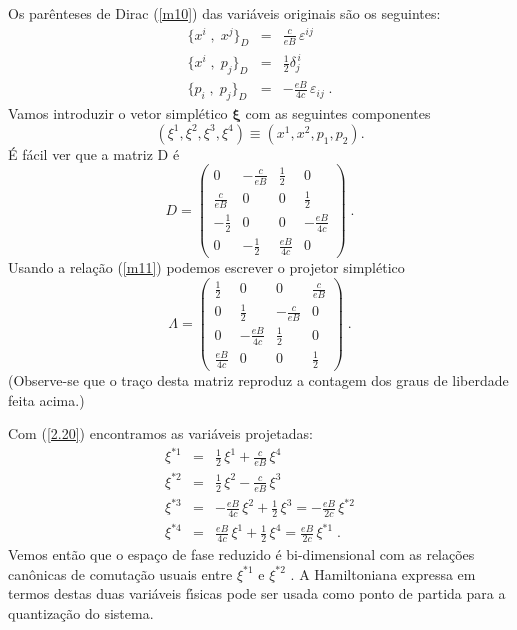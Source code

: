 \documentclass[a4paper,thmsa,12pt]{report}
\begin{document}
Os par\^{e}nteses de Dirac (\ref{m10}) das vari\'{a}veis originais s\~{a}o
os seguintes: 
\begin{eqnarray}
\{x^{i}\;,\;x^{j}\}_{D}&=&\frac{c}{eB}\,\varepsilon ^{ij}  \label{2.15} \\
\{x^{i}\;,\;p_{j}\}_{D}&=&\frac{1}{2}\delta _{j}^{\,i}  \label{2.16} \\
\{p_{i}\;,\;p_{j}\}_{D}&=&-\frac{eB}{4c}\,\varepsilon _{ij}\;.  \label{2.17}
\end{eqnarray}
Vamos introduzir o vetor simpl\'{e}tico $\mathbf{\xi }$ com as seguintes
componentes 
\begin{equation}
\left( \xi ^{1},\xi ^{2},\xi ^{3},\xi ^{4}\right) \equiv \left(
x^{1},x^{2},p_{1},p_{2}\right) .  \label{2.18}
\end{equation}
\'{E} f\'{a}cil ver que a matriz D \'{e} 
\begin{equation}
D={\left( 
\begin{array}{cccc}
0 & -\frac{c}{eB} & \frac{1}{2} & 0 \\ 
\frac{c}{eB} & 0 & 0 & \frac{1}{2} \\ 
-\frac{1}{2} & 0 & 0 & -\frac{eB}{4c} \\ 
0 & -\frac{1}{2} & \frac{eB}{4c} & 0
\end{array}
\right)} \;.  \label{2.19}
\end{equation}
Usando a rela\c{c}\~{a}o (\ref{m11}) podemos escrever o projetor
simpl\'{e}tico 
\begin{equation}
\Lambda ={\left( 
\begin{array}{cccc}
\frac{1}{2} & 0 & 0 & \frac{c}{eB} \\ 
0 & \frac{1}{2} & -\frac{c}{eB} & 0 \\ 
0 & -\frac{eB}{4c} & \frac{1}{2} & 0 \\ 
\frac{eB}{4c} & 0 & 0 & \frac{1}{2}
\end{array}
\right) }\;.  \label{2.20}
\end{equation}
(Observe-se que o tra\c{c}o desta matriz reproduz a contagem dos graus de
liberdade feita acima.)

Com (\ref{2.20}) encontramos as vari\'{a}veis projetadas: 
\begin{eqnarray}
\xi ^{\ast 1}&=&\frac{1}{2}\,\xi ^{1}+\frac{c}{eB}\,\xi ^{4}  \label{2.21} \\
\xi ^{\ast 2}&=&\frac{1}{2}\,\xi ^{2}-\frac{c}{eB}\,\xi ^{3}  \label{2.22}\\
\xi ^{\ast 3}&=&-\frac{eB}{4c}\,\xi ^{2}+\frac{1}{2}\,\xi ^{3}=-\frac{eB}{2c}%
\,\xi ^{\ast 2}  \label{2.23} \\
\xi ^{\ast 4}&=&\frac{eB}{4c}\,\xi ^{1}+\frac{1}{2}\,\xi ^{4}=\frac{eB}{2c}%
\,\xi ^{\ast 1}\;.  \label{2.24}
\end{eqnarray}
Vemos ent\~{a}o que o espa\c{c}o de fase reduzido \'{e} bi-dimensional com
as rela\c{c}\~{o}es can\^{o}nicas de comuta\c{c}\~{a}o usuais entre $\xi
^{*1}$ e $\xi ^{*2}$ . A Hamiltoniana expressa em termos destas duas
vari\'{a}veis f\'{\i}sicas pode ser usada como ponto de partida para a
quantiza\c{c}\~{a}o do sistema.
\end{document}
